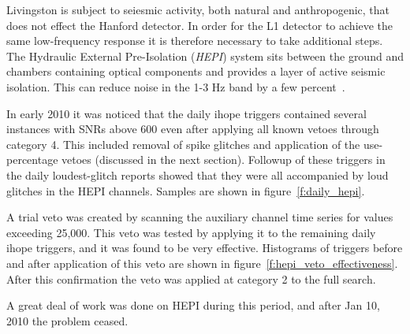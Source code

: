 
Livingston is subject to seiesmic activity, both natural and
anthropogenic, that does not effect the Hanford detector.  In order
for the L1 detector to achieve the same low-frequency response it is
therefore necessary to take additional steps.  The Hydraulic External
Pre-Isolation (\emph{HEPI}) system sits between the ground and
chambers containing optical components and provides a layer of active
seismic isolation.  This can reduce noise in the 1-3 Hz band by a few
percent~\cite{Wen:thesis}.

In early 2010 it was noticed that the daily ihope triggers contained
several instances with SNRs above 600 even after applying all known
vetoes through category 4.  This included removal of spike glitches
and application of the use-percentage vetoes (discussed in the next
section).  Followup of these triggers in the daily loudest-glitch
reports showed that they were all accompanied by loud glitches in the
HEPI channels.  Samples are shown in figure~\ref{f:daily_hepi}.

A trial veto was created by scanning the auxiliary channel time series
for values exceeding 25,000.  This veto was tested by applying it to
the remaining daily ihope triggers, and it was found to be very
effective.  Histograms of triggers before and after application of
this veto are shown in figure~\ref{f:hepi_veto_effectiveness}.  After
this confirmation the veto was applied at category 2 to the full
search.

A great deal of work was done on HEPI during this period, and after
Jan 10, 2010 the problem ceased.

%
%
%


